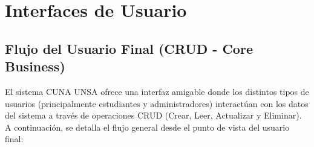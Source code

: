 \documentclass{article}
\begin{document}
\section{Interfaces de Usuario}

    \subsection{Flujo del Usuario Final (CRUD - Core Business)}

El sistema CUNA UNSA ofrece una interfaz amigable donde los distintos tipos de usuarios (principalmente estudiantes y administradores) interactúan con los datos del sistema a través de operaciones CRUD (Crear, Leer, Actualizar y Eliminar). A continuación, se detalla el flujo general desde el punto de vista del usuario final:
\end{document}
